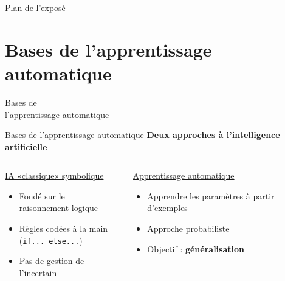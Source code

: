 \documentclass[french]{beamer}
\begin{document}

\begin{frame}{Plan de l'exposé}
  \tableofcontents
\end{frame}


\section{Bases de l'apprentissage automatique}

\begin{frame}{}
\centering
{\Huge Bases de \\ l'apprentissage automatique}
\end{frame}

\begin{frame}{Bases de l'apprentissage automatique}
\textbf{Deux approches à l'intelligence artificielle}
\vspace{0.5cm}

\begin{columns}[T] %
\begin{column}{.48\textwidth}
\begin{center}
\underline{IA «classique» symbolique}
\end{center}
\begin{itemize}
	\item Fondé sur le \\raisonnement logique
	\item Règles codées à la main \\(\texttt{if... else...})
	\item Pas de gestion de l'incertain
\end{itemize}

\end{column}%
\hfill%
\begin{column}{.48\textwidth}
\begin{center}
\underline{Apprentissage automatique}
\end{center}
\begin{itemize}
	\item Apprendre les paramètres à partir d'exemples
	\item Approche probabiliste
	\item Objectif : \textbf{généralisation}
\end{itemize}
\end{column}%
\end{columns}
\end{frame}
\end{document}
